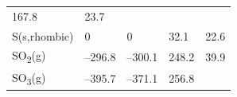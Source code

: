 \documentclass[
  9pt,
]{extbook}
\theoremstyle{definition}
\theoremstyle{definition}
\theoremstyle{definition}
\theoremstyle{remark}
\begin{document}
\begin{longtable}[]{@{}lllll@{}}
\begin{minipage}[t]{0.18\columnwidth}
167.8\strut
\end{minipage} & \begin{minipage}[t]{0.18\columnwidth}\raggedright
23.7\strut
\end{minipage}\tabularnewline
\begin{minipage}[t]{0.10\columnwidth}\raggedright
S(s,rhombic)\strut
\end{minipage} & \begin{minipage}[t]{0.19\columnwidth}\raggedright
0\strut
\end{minipage} & \begin{minipage}[t]{0.20\columnwidth}\raggedright
0\strut
\end{minipage} & \begin{minipage}[t]{0.18\columnwidth}\raggedright
32.1\strut
\end{minipage} & \begin{minipage}[t]{0.18\columnwidth}\raggedright
22.6\strut
\end{minipage}\tabularnewline
\begin{minipage}[t]{0.10\columnwidth}\raggedright
SO\textsubscript{2}(g)\strut
\end{minipage} & \begin{minipage}[t]{0.19\columnwidth}\raggedright
--296.8\strut
\end{minipage} & \begin{minipage}[t]{0.20\columnwidth}\raggedright
--300.1\strut
\end{minipage} & \begin{minipage}[t]{0.18\columnwidth}\raggedright
248.2\strut
\end{minipage} & \begin{minipage}[t]{0.18\columnwidth}\raggedright
39.9\strut
\end{minipage}\tabularnewline
\begin{minipage}[t]{0.10\columnwidth}\raggedright
SO\textsubscript{3}(g)\strut
\end{minipage} & \begin{minipage}[t]{0.19\columnwidth}\raggedright
--395.7\strut
\end{minipage} & \begin{minipage}[t]{0.20\columnwidth}\raggedright
--371.1\strut
\end{minipage} & \begin{minipage}[t]{0.18\columnwidth}\raggedright
256.8\strut
\end{minipage} & \begin{minipage}[t]{0.18\columnwidth}\raggedright

\end{minipage}
\end{longtable}
\end{document}
